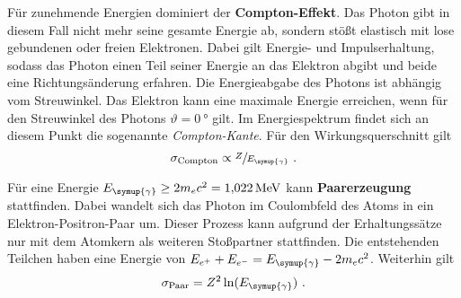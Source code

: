     \label{sec:theorie:comptoneffekt}
    Für zunehmende Energien dominiert der \textbf{Compton-Effekt}.
    Das Photon gibt in diesem Fall nicht mehr seine gesamte Energie ab,
    sondern stößt elastisch mit lose gebundenen oder freien Elektronen.
    Dabei gilt Energie- und Impulserhaltung,
    sodass das Photon einen Teil seiner Energie an das Elektron abgibt und beide eine Richtungsänderung erfahren.
    Die Energieabgabe des Photons ist abhängig vom Streuwinkel.
    Das Elektron kann eine maximale Energie erreichen,
    wenn für den Streuwinkel des Photons $\vartheta = \SI{0}{\degree}$ gilt.
    Im Energiespektrum findet sich an diesem Punkt die sogenannte \textit{Compton-Kante}.
    Für den Wirkungsquerschnitt gilt
    \begin{equation*}
        \sigma_\text{Compton} \propto \sfrac{Z}{E_{\symup{\gamma}}} \ .
    \end{equation*}


    \label{sec:theorie:paarerzeugung}
    Für eine Energie $E_{\symup{\gamma}} \geq 2m_{e}c^2 = \SI{1.022}{\mega\eV}$ kann \textbf{Paarerzeugung} stattfinden.
    Dabei wandelt sich das Photon im Coulombfeld des Atoms in ein Elektron-Positron-Paar um.
    Dieser Prozess kann aufgrund der Erhaltungssätze nur mit dem Atomkern als weiteren Stoßpartner stattfinden.
    Die entstehenden Teilchen haben eine Energie von $E_{e^{+}} + E_{e^{-}} = E_{\symup{\gamma}} - 2m_{e}c^2$.
    Weiterhin gilt
    \begin{equation*}
        \sigma_\text{Paar} = Z^2 \ln(E_{\symup{\gamma}}) \ .
    \end{equation*}


